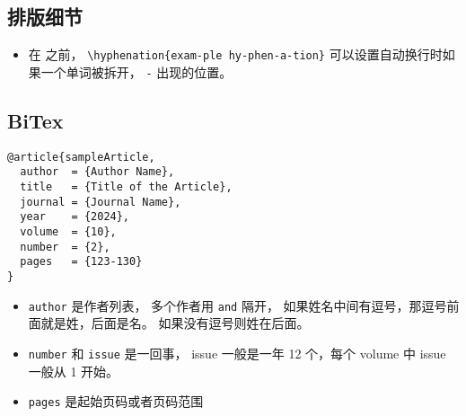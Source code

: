 
\begin{issues}
\issueDraft
\end{issues}

\subsection{排版细节}
\begin{itemize}
\item 在 \verb`` 之前， \verb`\hyphenation{exam-ple hy-phen-a-tion}` 可以设置自动换行时如果一个单词被拆开， \verb`-` 出现的位置。
\end{itemize}

\subsection{BiTex}

\begin{lstlisting}[language=none, caption=BibTeX 的例子]
@article{sampleArticle,
  author  = {Author Name},
  title   = {Title of the Article},
  journal = {Journal Name},
  year    = {2024},
  volume  = {10},
  number  = {2},
  pages   = {123-130}
}
\end{lstlisting}

\begin{itemize}
\item \verb`author` 是作者列表， 多个作者用 \verb`and` 隔开， 如果姓名中间有逗号，那逗号前面就是姓，后面是名。 如果没有逗号则姓在后面。
\item \verb`number` 和 \verb`issue` 是一回事， issue 一般是一年 12 个，每个 volume 中 issue 一般从 1 开始。
\item \verb`pages` 是起始页码或者页码范围
\end{itemize}
